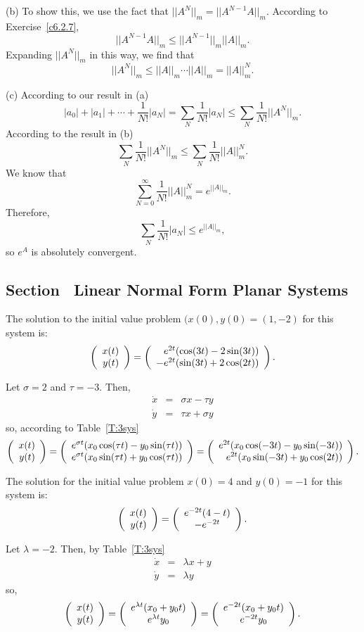 (b) To show this, we use the fact that $||A^N||_m = ||A^{N - 1}A||_m$.
According to Exercise~\ref{c6.2.7},
\[
||A^{N - 1}A||_m \leq ||A^{N - 1}||_m ||A||_m.
\]
Expanding $||A^N||_m$ in this way, we find that
\[
||A^N||_m \leq ||A||_m \cdots ||A||_m = ||A||^N_m.
\]

(c) According to our result in (a)
\[ |a_0| + |a_1| + \cdots + \frac{1}{N!}|a_N| = \sum_N
\frac{1}{N!}|a_N| \leq \sum_N \frac{1}{N!}||A^N||_m. \]
According to the result in (b)
\[ \sum_N \frac{1}{N!}||A^N||_m \leq \sum_N \frac{1}{N!}||A||^N_m. \]
We know that
\[ \sum_{N = 0}^{\infty} \frac{1}{N!}||A||^N_m = e^{||A||_m}.  \]
Therefore,
\[ \sum_N \frac{1}{N!}|a_N| \leq e^{||A||_m}, \]
so $e^A$ is absolutely convergent.



\newpage
\subsection*{Section~\protect{\ref{S:LNFPS}} Linear Normal Form Planar Systems}

\ans The solution to the initial value problem $(x(0),y(0) = (1,-2)$ for
this system is:
\[
\left(\begin{array}{r} x(t) \\ y(t)\end{array}\right) = \left(\begin{array}{r} e^{2t}(\cos(3t) - 2\sin(3t)) \\ -e^{2t}(\sin(3t) + 2\cos(2t))\end{array}\right).
\]

\soln Let $\sigma = 2$ and $\tau = -3$.  Then,
\[
\begin{array}{rrr}
\dot{x} & = & \sigma x - \tau y \\
\dot{y} & = & \tau x + \sigma y \end{array}
\]
so, according to Table~\ref{T:3sys}
\[
\left(\begin{array}{r} x(t) \\ y(t)\end{array}\right) = \left(\begin{array}{r} e^{\sigma t}(x_0\cos(\tau t) -
y_0\sin(\tau t)) \\ e^{\sigma t}(x_0\sin(\tau t) +
y_0\cos(\tau t))\end{array}\right) = \left(\begin{array}{r} e^{2t}(x_0\cos(-3t) - y_0\sin(-3t)) \\ e^{2t}(x_0\sin(-3t) + y_0\cos(2t))\end{array}\right).
\]

\ans The solution for the initial value problem $x(0) = 4$ and
$y(0) = -1$ for this system is:
\[
\left(\begin{array}{r} x(t) \\ y(t)\end{array}\right) = \left(\begin{array}{c} e^{-2t}(4 - t) \\ -e^{-2t}\end{array}\right).
\]

\soln Let $\lambda = -2$.  Then, by Table~\ref{T:3sys}
\[
\begin{array}{rrr}
\dot{x} & = & \lambda x + y \\
\dot{y} & = & \lambda y \end{array}
\]
so, 
\[
\left(\begin{array}{r} x(t) \\ y(t)\end{array}\right) = \left(\begin{array}{c} e^{\lambda t}(x_0 + y_0t) \\ e^{\lambda t}y_0\end{array}\right)
= \left(\begin{array}{c} e^{-2t}(x_0 + y_0t) \\ e^{-2t}y_0\end{array}\right).
\]

